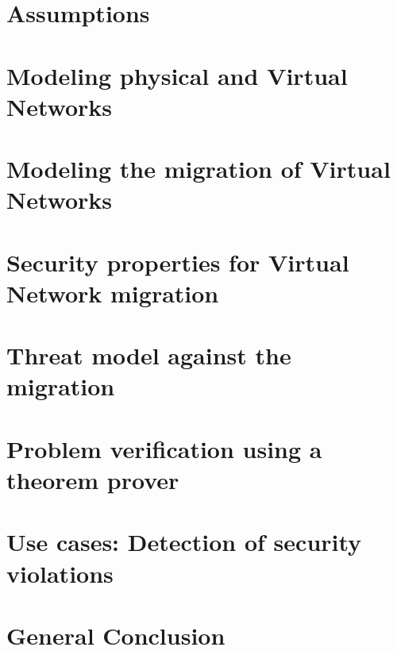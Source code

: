 \documentclass[a4paper, 11pt]{report}
\theoremstyle{definition}
\begin{document}
% 

\section{Assumptions}


\newpage
\section{Modeling physical and Virtual Networks}


\newpage
\section{Modeling the migration of Virtual Networks}


\newpage
\section{Security properties for Virtual Network migration}




\section{Threat model against the migration}


\section{Problem verification using a theorem prover}


\section{Use cases: Detection of security violations}


\newpage
\section{General Conclusion}

\end{document}
